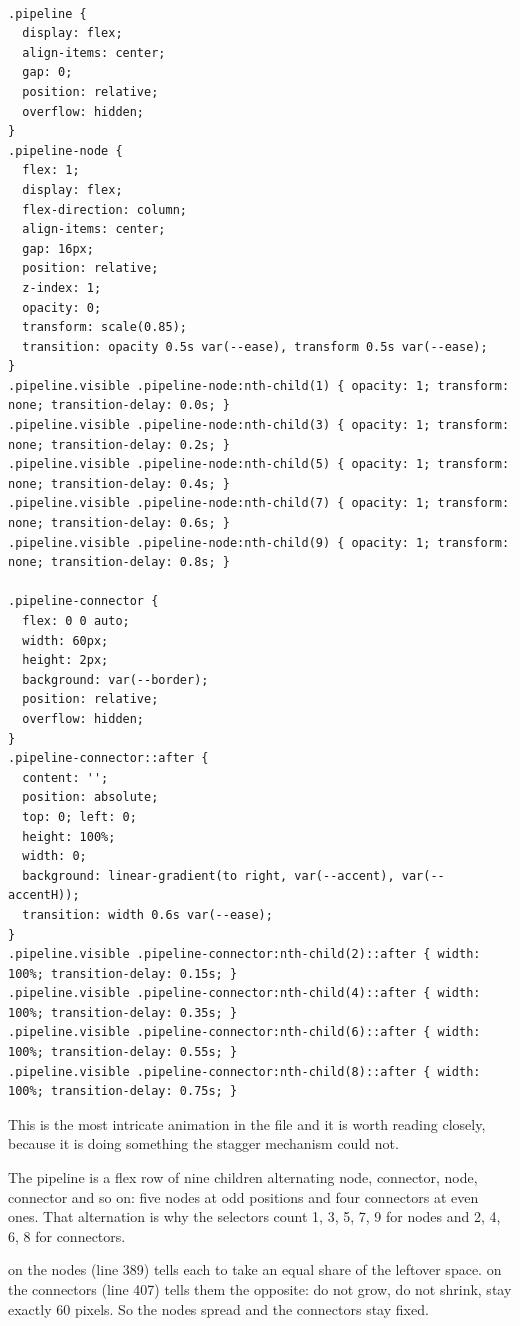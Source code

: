 \begin{lstlisting}[firstnumber=380,caption={\file{css/site.css}, lines 380--426}]

.pipeline {
  display: flex;
  align-items: center;
  gap: 0;
  position: relative;
  overflow: hidden;
}
.pipeline-node {
  flex: 1;
  display: flex;
  flex-direction: column;
  align-items: center;
  gap: 16px;
  position: relative;
  z-index: 1;
  opacity: 0;
  transform: scale(0.85);
  transition: opacity 0.5s var(--ease), transform 0.5s var(--ease);
}
.pipeline.visible .pipeline-node:nth-child(1) { opacity: 1; transform: none; transition-delay: 0.0s; }
.pipeline.visible .pipeline-node:nth-child(3) { opacity: 1; transform: none; transition-delay: 0.2s; }
.pipeline.visible .pipeline-node:nth-child(5) { opacity: 1; transform: none; transition-delay: 0.4s; }
.pipeline.visible .pipeline-node:nth-child(7) { opacity: 1; transform: none; transition-delay: 0.6s; }
.pipeline.visible .pipeline-node:nth-child(9) { opacity: 1; transform: none; transition-delay: 0.8s; }

.pipeline-connector {
  flex: 0 0 auto;
  width: 60px;
  height: 2px;
  background: var(--border);
  position: relative;
  overflow: hidden;
}
.pipeline-connector::after {
  content: '';
  position: absolute;
  top: 0; left: 0;
  height: 100%;
  width: 0;
  background: linear-gradient(to right, var(--accent), var(--accentH));
  transition: width 0.6s var(--ease);
}
.pipeline.visible .pipeline-connector:nth-child(2)::after { width: 100%; transition-delay: 0.15s; }
.pipeline.visible .pipeline-connector:nth-child(4)::after { width: 100%; transition-delay: 0.35s; }
.pipeline.visible .pipeline-connector:nth-child(6)::after { width: 100%; transition-delay: 0.55s; }
.pipeline.visible .pipeline-connector:nth-child(8)::after { width: 100%; transition-delay: 0.75s; }
\end{lstlisting}

This is the most intricate animation in the file and it is worth reading closely,
because it is doing something the stagger mechanism could not.

The pipeline is a flex row of nine children alternating node, connector, node,
connector and so on: five nodes at odd positions and four connectors at even ones.
That alternation is why the selectors count 1, 3, 5, 7, 9 for nodes and 2, 4, 6, 8
for connectors.

 on the nodes (line 389) tells each to take an equal share of the
leftover space.  on the connectors (line 407) tells them the
opposite: do not grow, do not shrink, stay exactly 60 pixels. So the nodes spread
and the connectors stay fixed.

